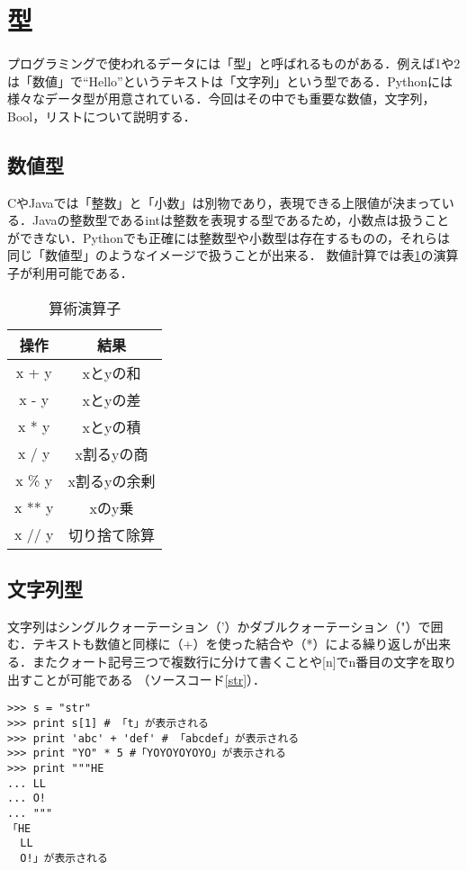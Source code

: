 
\section{型}
プログラミングで使われるデータには「型」と呼ばれるものがある．例えば1や2は「数値」で``Hello''というテキストは「文字列」という型である．Pythonには様々なデータ型が用意されている．今回はその中でも重要な数値，文字列，Bool，リストについて説明する．
\subsection{数値型}
CやJavaでは「整数」と「小数」は別物であり，表現できる上限値が決まっている．Javaの整数型であるintは整数を表現する型であるため，小数点は扱うことができない．Pythonでも正確には整数型や小数型は存在するものの，それらは同じ「数値型」のようなイメージで扱うことが出来る．
数値計算では表\ref{arithmetic_operator}の演算子が利用可能である．

\begin{table}[h]
\centering
 \caption{算術演算子}
  \begin{tabular}{|c|c|} \hline
    操作 & 結果  \\ \hline \hline
    x + y & xとyの和 \\ \hline
    x - y & xとyの差 \\ \hline
    x * y & xとyの積 \\ \hline
    x / y & x割るyの商 \\ \hline
    x \% y & x割るyの余剰 \\ \hline
    x ** y & xのy乗 \\ \hline
    x // y & 切り捨て除算 \\ \hline
  \end{tabular} 
 \label{arithmetic_operator}
\end{table}

\subsection{文字列型}
文字列はシングルクォーテーション（'）かダブルクォーテーション（"）で囲む．テキストも数値と同様に（+）を使った結合や（*）による繰り返しが出来る．またクォート記号三つで複数行に分けて書くことや[n]でn番目の文字を取り出すことが可能である （ソースコード\ref{str}）．
\begin{lstlisting}[caption=文字列の操作, label=str]
>>> s = "str"
>>> print s[1] # 「t」が表示される
>>> print 'abc' + 'def' # 「abcdef」が表示される
>>> print "YO" * 5 #「YOYOYOYOYO」が表示される 
>>> print """HE
... LL
... O!
... """
「HE
  LL
  O!」が表示される
\end{lstlisting}

